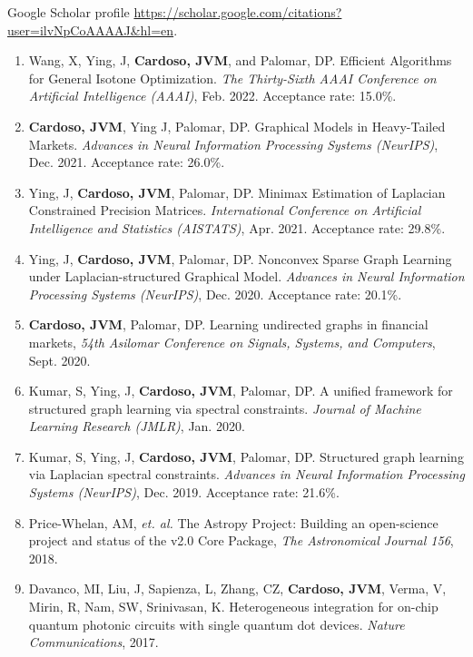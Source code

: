 \documentclass[10pt]{article}
\begin{document}
\begin{titlepage}
{\small Google Scholar profile \url{https://scholar.google.com/citations?user=ilvNpCoAAAAJ&hl=en}.}
\begin{enumerate}
  \item Wang, X, Ying, J, \textbf{Cardoso, JVM}, and Palomar, DP.
    Efficient Algorithms for General Isotone Optimization.
    \textit{The Thirty-Sixth AAAI Conference on Artificial Intelligence (AAAI)}, Feb. 2022. Acceptance rate: 15.0\%.
  \item \textbf{Cardoso, JVM}, Ying J, Palomar, DP. Graphical Models in Heavy-Tailed Markets.
  \textit{Advances in Neural Information Processing Systems (NeurIPS)}, Dec. 2021. Acceptance rate: 26.0\%.
  \item Ying, J, \textbf{Cardoso, JVM}, Palomar, DP. Minimax Estimation of Laplacian Constrained Precision Matrices.
    \textit{International Conference on Artificial Intelligence and Statistics (AISTATS)}, Apr. 2021. Acceptance rate: 29.8\%.
  \item Ying, J, \textbf{Cardoso, JVM}, Palomar, DP. Nonconvex Sparse Graph Learning under Laplacian-structured Graphical Model.
  \textit{Advances in Neural Information Processing Systems (NeurIPS)}, Dec. 2020. Acceptance rate: 20.1\%.
  \item \textbf{Cardoso, JVM}, Palomar, DP. Learning undirected graphs in financial markets, \textit{54th Asilomar Conference on Signals, Systems, and Computers}, Sept. 2020.
  \item Kumar, S, Ying, J, \textbf{Cardoso, JVM}, Palomar, DP. A unified framework for structured graph
    learning via spectral constraints. \textit{Journal of Machine Learning Research (JMLR)}, Jan. 2020.
  \item Kumar, S, Ying, J, \textbf{Cardoso, JVM}, Palomar, DP. Structured graph learning via Laplacian
    spectral constraints. \textit{Advances in Neural Information Processing Systems (NeurIPS)}, Dec. 2019. Acceptance rate: 21.6\%.
  \item Price-Whelan, AM, \textit{et. al.} The Astropy Project: Building an open-science project and status of the v2.0 Core Package, \textit{The Astronomical Journal 156}, 2018.
\item Davanco, MI, Liu, J, Sapienza, L, Zhang, CZ, \textbf{Cardoso, JVM}, Verma, V, Mirin, R, Nam,
SW, Srinivasan, K. Heterogeneous integration for on-chip quantum photonic circuits with single quantum dot devices.
\textit{Nature Communications}, 2017.
\end{enumerate}



\end{titlepage}
\end{document}
